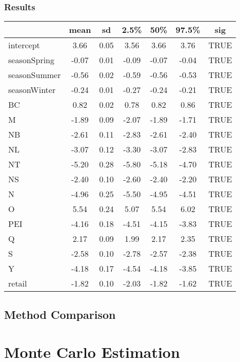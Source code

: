 \documentclass[12pt]{article}
\begin{document}
\subsubsection*{Results}
\begin{table}[hbt!]
    \centering
    \begin{tabular}{|l|c|c|c|c|c|c|}
      \hline
     & mean & sd & 2.5\% & 50\% & 97.5\% & sig \\ 
     \hline
     intercept & 3.66 & 0.05 & 3.56 & 3.66 & 3.76 & TRUE \\ 
       seasonSpring & -0.07 & 0.01 & -0.09 & -0.07 & -0.04 & TRUE \\ 
       seasonSummer & -0.56 & 0.02 & -0.59 & -0.56 & -0.53 & TRUE \\ 
       seasonWinter & -0.24 & 0.01 & -0.27 & -0.24 & -0.21 & TRUE \\ 
       BC & 0.82 & 0.02 & 0.78 & 0.82 & 0.86 & TRUE \\ 
       M & -1.89 & 0.09 & -2.07 & -1.89 & -1.71 & TRUE \\ 
       NB & -2.61 & 0.11 & -2.83 & -2.61 & -2.40 & TRUE \\ 
       NL & -3.07 & 0.12 & -3.30 & -3.07 & -2.83 & TRUE \\ 
       NT & -5.20 & 0.28 & -5.80 & -5.18 & -4.70 & TRUE \\ 
       NS & -2.40 & 0.10 & -2.60 & -2.40 & -2.20 & TRUE \\ 
       N & -4.96 & 0.25 & -5.50 & -4.95 & -4.51 & TRUE \\ 
       O & 5.54 & 0.24 & 5.07 & 5.54 & 6.02 & TRUE \\ 
       PEI & -4.16 & 0.18 & -4.51 & -4.15 & -3.83 & TRUE \\ 
       Q & 2.17 & 0.09 & 1.99 & 2.17 & 2.35 & TRUE \\ 
       S & -2.58 & 0.10 & -2.78 & -2.57 & -2.38 & TRUE \\ 
       Y & -4.18 & 0.17 & -4.54 & -4.18 & -3.85 & TRUE \\ 
       retail & -1.82 & 0.10 & -2.03 & -1.82 & -1.62 & TRUE \\ 
        \hline
    \end{tabular}
\end{table}
    
\subsection{Method Comparison}


\newpage
\section{Monte Carlo Estimation}
\end{document}
